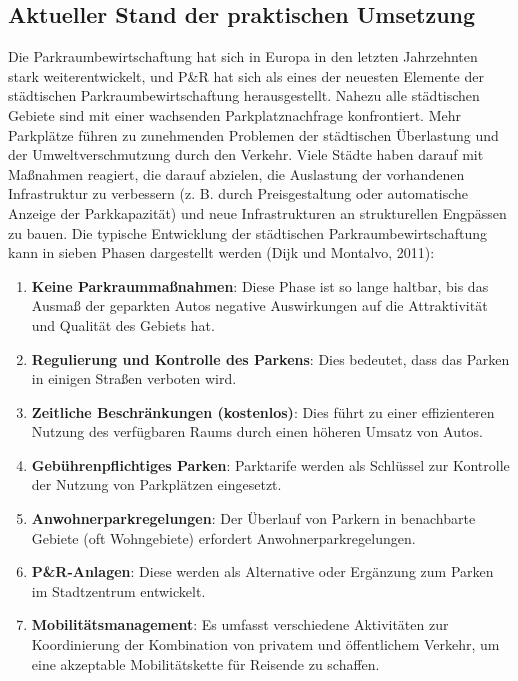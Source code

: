 \documentclass[
]{book}
\providecommand{\tightlist}{%
  \setlength{\itemsep}{0pt}\setlength{\parskip}{0pt}}
\begin{document}
\hypertarget{aktueller-stand-der-praktischen-umsetzung-25}{%
\subsection*{Aktueller Stand der praktischen Umsetzung}\label{aktueller-stand-der-praktischen-umsetzung-25}}

Die Parkraumbewirtschaftung hat sich in Europa in den letzten Jahrzehnten stark weiterentwickelt, und P\&R hat sich als eines der neuesten Elemente der städtischen Parkraumbewirtschaftung herausgestellt. Nahezu alle städtischen Gebiete sind mit einer wachsenden Parkplatznachfrage konfrontiert. Mehr Parkplätze führen zu zunehmenden Problemen der städtischen Überlastung und der Umweltverschmutzung durch den Verkehr. Viele Städte haben darauf mit Maßnahmen reagiert, die darauf abzielen, die Auslastung der vorhandenen Infrastruktur zu verbessern (z. B. durch Preisgestaltung oder automatische Anzeige der Parkkapazität) und neue Infrastrukturen an strukturellen Engpässen zu bauen. Die typische Entwicklung der städtischen Parkraumbewirtschaftung kann in sieben Phasen dargestellt werden (Dijk und Montalvo, 2011):

\begin{enumerate}
\def\labelenumi{\arabic{enumi}.}
\tightlist
\item
  \textbf{Keine Parkraummaßnahmen}: Diese Phase ist so lange haltbar, bis das Ausmaß der geparkten Autos negative Auswirkungen auf die Attraktivität und Qualität des Gebiets hat.
\item
  \textbf{Regulierung und Kontrolle des Parkens}: Dies bedeutet, dass das Parken in einigen Straßen verboten wird.
\item
  \textbf{Zeitliche Beschränkungen (kostenlos)}: Dies führt zu einer effizienteren Nutzung des verfügbaren Raums durch einen höheren Umsatz von Autos.
\item
  \textbf{Gebührenpflichtiges Parken}: Parktarife werden als Schlüssel zur Kontrolle der Nutzung von Parkplätzen eingesetzt.
\item
  \textbf{Anwohnerparkregelungen}: Der Überlauf von Parkern in benachbarte Gebiete (oft Wohngebiete) erfordert Anwohnerparkregelungen.
\item
  \textbf{P\&R-Anlagen}: Diese werden als Alternative oder Ergänzung zum Parken im Stadtzentrum entwickelt.
\item
  \textbf{Mobilitätsmanagement}: Es umfasst verschiedene Aktivitäten zur Koordinierung der Kombination von privatem und öffentlichem Verkehr, um eine akzeptable Mobilitätskette für Reisende zu schaffen.
\end{enumerate}
\end{document}
